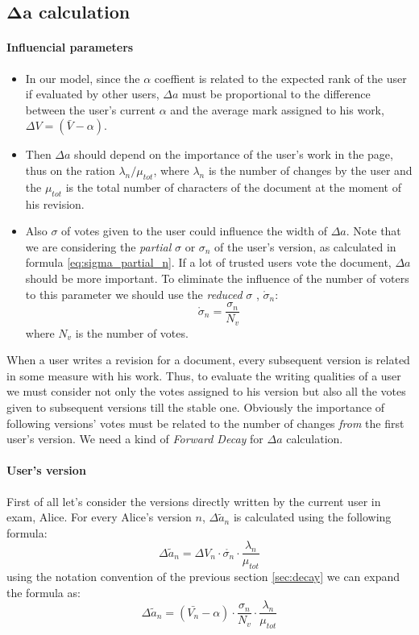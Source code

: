 \documentclass[a4paper,11pt]{article}
\newcommand{\sg}{$\sigma$ }
\newcommand{\al}{$\alpha$ }
\begin{document}
\subsection{$\mathbf{\Delta a}$ calculation} \label{sec:deltaa}
\paragraph{Influencial parameters} 
\begin{itemize}
\item In our model, since the \al coeffient is related to the expected rank of the user if evaluated by other users, $\Delta a$ must be proportional to the difference between the user's current \al and the average mark assigned to his work, $\Delta V = ( \bar{V} - \alpha)$.
\item Then $\Delta a$ should depend on the importance of the user's work in the page, thus on the ration $\lambda_n / \mu_{tot}$, where $\lambda_n$ is the number of changes by the user and the $\mu_{tot}$ is the total number of characters of the document at the moment of his revision.
\item Also \sg of votes given to the user could influence the width of $\Delta a$. Note that we are considering the \emph{partial} \sg or $\sigma_n$ of the user's version, as calculated in formula \ref{eq:sigma_partial_n}. If a lot of trusted users vote the document, $\Delta a$ should be more important. To eliminate the influence of the number of voters to this parameter we should use the \emph{reduced} \sg, $\mathring{\sigma}_n$:
\begin{equation}
\mathring{\sigma} _n= \frac{\sigma_n}{N_v}
\end{equation}
where $N_v$ is the number of votes. 
\end{itemize}

When a user writes a revision for a document, every subsequent version is related in some measure with his work. Thus, to evaluate the writing qualities of a user we must consider not only the votes assigned to his version but also all the votes given to subsequent versions till the stable one. Obviously the importance of following versions' votes must be related to the number of changes \emph{from} the first user's version. 
We need a kind of \emph{Forward Decay} for $\Delta a$ calculation.

\paragraph{User's version} First of all let's consider the versions directly written by the current user in exam, Alice. For every Alice's version $n$, $\Delta \tilde{a}_n$ is calculated using the following formula:
\begin{equation} 
\Delta \tilde{a}_n = \Delta V_n  \cdot \mathring{\sigma_n} \cdot \frac{\lambda_n}{\mu_{tot}}
\end{equation}
using the notation convention of the previous section \ref{sec:decay} we can expand the formula as:
\begin{equation}\label{eq:delta_a_par}
\Delta \tilde{a}_n = \left(\bar{V_n} - \alpha\right) \cdot \frac{\sigma_n}{N_v} \cdot \frac{\lambda_n}{\mu_{tot}}
\end{equation}
\end{document}
